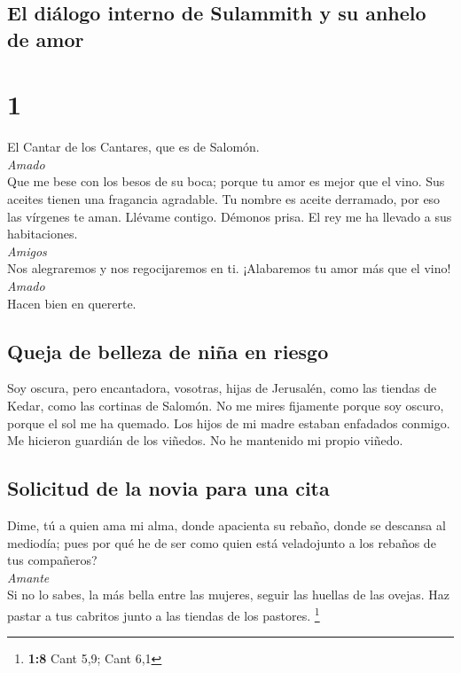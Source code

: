\hypertarget{el-diuxe1logo-interno-de-sulammith-y-su-anhelo-de-amor}{%
\subsection{El diálogo interno de Sulammith y su anhelo de
amor}\label{el-diuxe1logo-interno-de-sulammith-y-su-anhelo-de-amor}}

\hypertarget{section}{%
\section{1}\label{section}}

 El Cantar de los Cantares, que es de Salomón.\\
\emph{Amado}\\
 Que me bese con los besos de su boca; porque tu amor es
mejor que el vino.  Sus aceites tienen una fragancia
agradable. Tu nombre es aceite derramado, por eso las vírgenes te aman.
 Llévame contigo. Démonos prisa. El rey me ha llevado a
sus habitaciones.\\
\emph{Amigos}\\
Nos alegraremos y nos regocijaremos en ti. ¡Alabaremos tu amor más que
el vino!\\
\emph{Amado}\\
Hacen bien en quererte.

\hypertarget{queja-de-belleza-de-niuxf1a-en-riesgo}{%
\subsection{Queja de belleza de niña en
riesgo}\label{queja-de-belleza-de-niuxf1a-en-riesgo}}

 Soy oscura, pero encantadora, vosotras, hijas de
Jerusalén, como las tiendas de Kedar, como las cortinas de Salomón.
 No me mires fijamente porque soy oscuro, porque el sol me
ha quemado. Los hijos de mi madre estaban enfadados conmigo. Me hicieron
guardián de los viñedos. No he mantenido mi propio viñedo.

\hypertarget{solicitud-de-la-novia-para-una-cita}{%
\subsection{Solicitud de la novia para una
cita}\label{solicitud-de-la-novia-para-una-cita}}

 Dime, tú a quien ama mi alma, donde apacienta su rebaño,
donde se descansa al mediodía; pues por qué he de ser como quien está
veladojunto a los rebaños de tus compañeros?\\
\emph{Amante}\\
 Si no lo sabes, la más bella entre las mujeres, seguir
las huellas de las ovejas. Haz pastar a tus cabritos junto a las tiendas
de los pastores. \footnote{\textbf{1:8} Cant 5,9; Cant 6,1}

